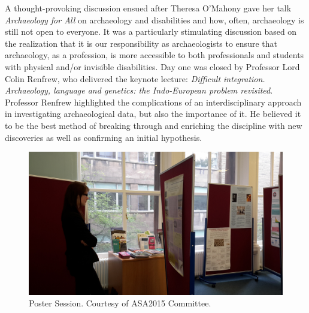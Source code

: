 	A thought-provoking discussion ensued after Theresa O’Mahony gave her talk \textit{Archaeology for All} on archaeology and disabilities and how, often, archaeology is still not open to everyone. It was a particularly stimulating discussion based on the realization that it is our responsibility as archaeologists to ensure that archaeology, as a profession, is more accessible to both professionals and students with physical and/or invisible disabilities. Day one was closed by Professor Lord Colin Renfrew, who delivered the keynote lecture: \textit{Difficult integration. Archaeology, language and genetics: the Indo-European problem revisited}. Professor Renfrew highlighted the complications of an interdisciplinary approach in investigating archaeological data, but also the importance of it. He believed it to be the best method of breaking through and enriching the discipline with new discoveries as well as confirming an initial hypothesis.
\begin{figure}%
	\includegraphics[width=\linewidth]{figures/ASA_Fig1}
	\centering
	\caption{Poster Session. Courtesy of ASA2015 Committee.}
	\label{fig:ASA_Fig1}
\end{figure}
	
